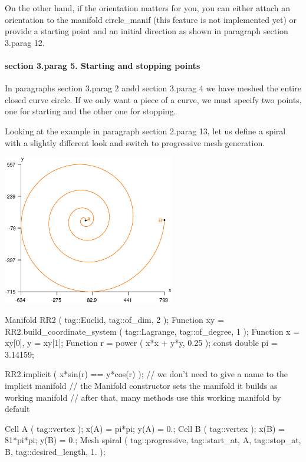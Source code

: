 On the other hand, if the orientation matters for you, you can either attach an orientation
to the manifold {\codett circle\_manif} (this feature is not implemented yet)
or provide a starting point and an initial direction as shown in paragraph
\numb section 3.\numb parag 12.


\paragraph{\numb section 3.\numb parag 5. Starting and stopping points}

In paragraphs \numb section 3.\numb parag 2 andd \numb section 3.\numb parag 4 we have meshed
the entire closed curve {\codett circle}.
If we only want a piece of a curve, we must specify two points, one for starting and
the other one for stopping.

Looking at the example in paragraph \numb section 2.\numb parag 13, let us define a
spiral with a slightly different look and switch to progressive mesh generation.

{ 
\centerline{\includegraphics[width=75mm]{spiral-prog.eps}}}

\verbatim
   Manifold RR2 ( tag::Euclid, tag::of_dim, 2 );
   Function xy = RR2.build_coordinate_system ( tag::Lagrange, tag::of_degree, 1 );
   Function x = xy[0],  y = xy[1];
   Function r = power ( x*x + y*y, 0.25 );
   const double pi = 3.14159;
   
   RR2.implicit ( x*sin(r) == y*cos(r) );
   // we don't need to give a name to the implicit manifold
   // the Manifold constructor sets the manifold it builds as working manifold
   // after that, many methods use this working manifold by default
   
   Cell A ( tag::vertex );  x(A) =    pi*pi;   y(A) =  0.;
   Cell B ( tag::vertex );  x(B) = 81*pi*pi;   y(B) =  0.;
   Mesh spiral ( tag::progressive, tag::start_at, A,
                 tag::stop_at, B, tag::desired_length, 1. );
\endverbatim

